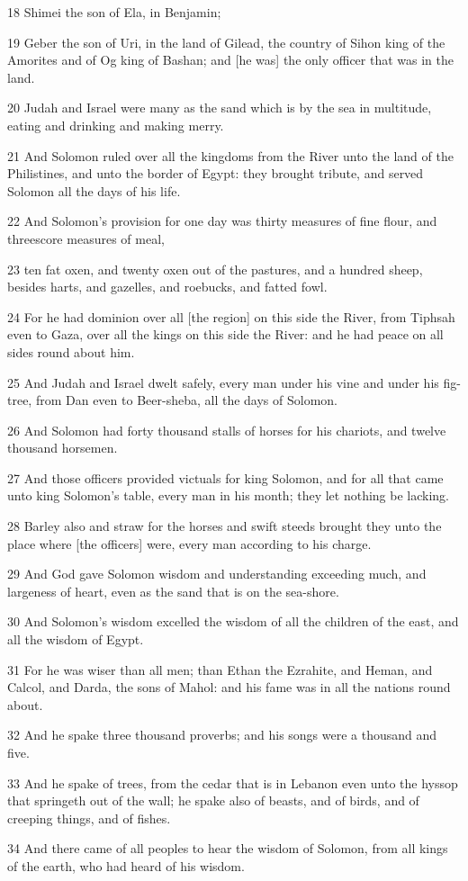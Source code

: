 \par 18 Shimei the son of Ela, in Benjamin;
\par 19 Geber the son of Uri, in the land of Gilead, the country of Sihon king of the Amorites and of Og king of Bashan; and [he was] the only officer that was in the land.
\par 20 Judah and Israel were many as the sand which is by the sea in multitude, eating and drinking and making merry.
\par 21 And Solomon ruled over all the kingdoms from the River unto the land of the Philistines, and unto the border of Egypt: they brought tribute, and served Solomon all the days of his life.
\par 22 And Solomon's provision for one day was thirty measures of fine flour, and threescore measures of meal,
\par 23 ten fat oxen, and twenty oxen out of the pastures, and a hundred sheep, besides harts, and gazelles, and roebucks, and fatted fowl.
\par 24 For he had dominion over all [the region] on this side the River, from Tiphsah even to Gaza, over all the kings on this side the River: and he had peace on all sides round about him.
\par 25 And Judah and Israel dwelt safely, every man under his vine and under his fig-tree, from Dan even to Beer-sheba, all the days of Solomon.
\par 26 And Solomon had forty thousand stalls of horses for his chariots, and twelve thousand horsemen.
\par 27 And those officers provided victuals for king Solomon, and for all that came unto king Solomon's table, every man in his month; they let nothing be lacking.
\par 28 Barley also and straw for the horses and swift steeds brought they unto the place where [the officers] were, every man according to his charge.
\par 29 And God gave Solomon wisdom and understanding exceeding much, and largeness of heart, even as the sand that is on the sea-shore.
\par 30 And Solomon's wisdom excelled the wisdom of all the children of the east, and all the wisdom of Egypt.
\par 31 For he was wiser than all men; than Ethan the Ezrahite, and Heman, and Calcol, and Darda, the sons of Mahol: and his fame was in all the nations round about.
\par 32 And he spake three thousand proverbs; and his songs were a thousand and five.
\par 33 And he spake of trees, from the cedar that is in Lebanon even unto the hyssop that springeth out of the wall; he spake also of beasts, and of birds, and of creeping things, and of fishes.
\par 34 And there came of all peoples to hear the wisdom of Solomon, from all kings of the earth, who had heard of his wisdom.


